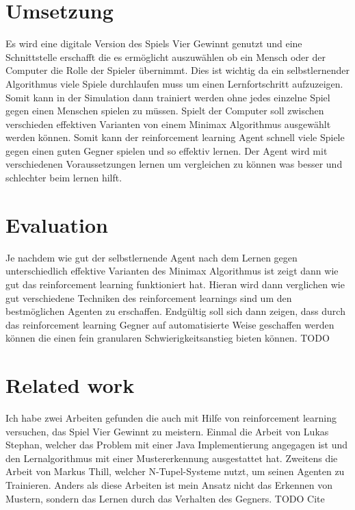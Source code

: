 \section{Umsetzung}

Es wird eine digitale Version des Spiels Vier Gewinnt genutzt und eine Schnittstelle erschafft die es ermöglicht auszuwählen ob ein Mensch oder der Computer die Rolle der Spieler übernimmt. Dies ist wichtig da ein selbstlernender Algorithmus viele Spiele durchlaufen muss um einen Lernfortschritt aufzuzeigen. Somit kann in der Simulation dann trainiert werden ohne jedes einzelne Spiel gegen einen Menschen spielen zu müssen. Spielt der Computer soll zwischen verschieden effektiven Varianten von einem Minimax Algorithmus ausgewählt werden können. Somit kann der reinforcement learning Agent schnell viele Spiele gegen einen guten Gegner spielen und so effektiv lernen. 
Der Agent wird mit verschiedenen Voraussetzungen lernen um vergleichen zu können was besser und schlechter beim lernen hilft.


\section{Evaluation}
Je nachdem wie gut der selbstlernende Agent nach dem Lernen gegen unterschiedlich effektive Varianten des Minimax Algorithmus ist zeigt dann wie gut das reinforcement learning funktioniert hat.
Hieran wird dann verglichen wie gut verschiedene Techniken des reinforcement learnings sind um den bestmöglichen Agenten zu erschaffen.
Endgültig soll sich dann zeigen, dass durch das reinforcement learning Gegner auf automatisierte Weise geschaffen werden können die einen fein granularen Schwierigkeitsanstieg bieten können. \colorbox{red!30}{TODO}

\section{Related work}
Ich habe zwei Arbeiten gefunden die auch mit Hilfe von reinforcement learning versuchen, das Spiel Vier Gewinnt zu meistern. Einmal die Arbeit von Lukas Stephan, welcher das Problem mit einer Java Implementierung angegagen ist und den Lernalgorithmus mit einer Mustererkennung ausgestattet hat. Zweitens die Arbeit von Markus Thill, welcher N-Tupel-Systeme nutzt, um seinen Agenten zu Trainieren. Anders als diese Arbeiten ist mein Ansatz nicht das Erkennen von Mustern, sondern das Lernen durch das Verhalten des Gegners.
\colorbox{red!30}{TODO Cite}









